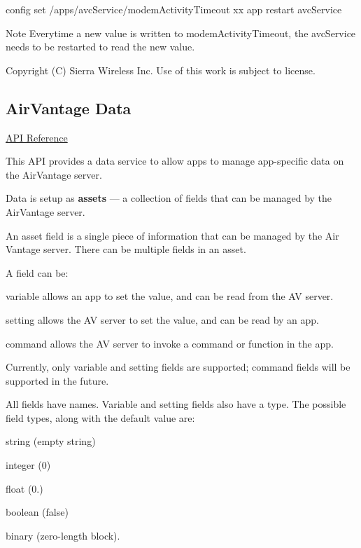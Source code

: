 \begin{DoxyVerb}config set /apps/avcService/modemActivityTimeout xx
app restart avcService
\end{DoxyVerb}


\begin{DoxyNote}{Note}
Everytime a new value is written to modem\+Activity\+Timeout, the avc\+Service needs to be restarted to read the new value.
\end{DoxyNote}




Copyright (C) Sierra Wireless Inc. Use of this work is subject to license. \hypertarget{c_le_avdata}{}\subsection{Air\+Vantage Data}\label{c_le_avdata}
\hyperlink{le__avdata__interface_8h}{A\+P\+I Reference}





This A\+P\+I provides a data service to allow apps to manage app-\/specific data on the Air\+Vantage server.

Data is setup as {\bfseries assets} --- a collection of fields that can be managed by the Air\+Vantage server.

An asset field is a single piece of information that can be managed by the Air Vantage server. There can be multiple fields in an asset.

A field can be\+:
\begin{DoxyItemize}
\item {\ttfamily variable} allows an app to set the value, and can be read from the A\+V server.
\item {\ttfamily setting} allows the A\+V server to set the value, and can be read by an app.
\item {\ttfamily command} allows the A\+V server to invoke a command or function in the app.
\end{DoxyItemize}

Currently, only variable and setting fields are supported; command fields will be supported in the future.

All fields have names. Variable and setting fields also have a type. The possible field types, along with the default value are\+:
\begin{DoxyItemize}
\item string (empty string)
\item integer (0)
\item float (0.)
\item boolean (false)
\item binary (zero-\/length block).
\end{DoxyItemize}

